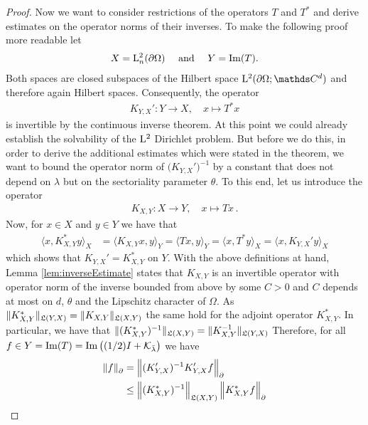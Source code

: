 \begin{proof}
  Now we want to consider restrictions of the operators $T$ and $T^*$ and derive estimates on the operator norms of their inverses.
  To make the following proof more readable let 
  \begin{align*}
    X = \mathrm{L}^2_n(\partial\Omega)\quad\text{ and }\quad Y = \operatorname{Im}(T).
  \end{align*}
  Both spaces are closed subspaces of the Hilbert space $\Ell^2(\partial\Omega; \C^d)$ and therefore again Hilbert spaces.
  Consequently, the operator
  \begin{align*}
    K_{Y,X}' \colon Y \to X, \quad x \mapsto T^* x
  \end{align*}
  is invertible by the continuous inverse theorem.
  At this point we could already establish the solvability of the $\mathrm{L}^2$ Dirichlet problem.
  But before we do this, in order to derive the additional estimates which were stated in the theorem, we want to bound the operator norm of $\big(K_{Y,X}'\big)^{-1}$ by a constant that does not depend on $\lambda$ but on the sectoriality parameter $\theta$.
  To this end, let us introduce the operator
  \begin{align*}
    K_{X,Y} \colon X \to Y, \quad x \mapsto T x \,.
  \end{align*}
  Now, for $x \in X$ and $y \in Y$ we have that
  \begin{align*}
    \Big\langle x, K_{X,Y}^* y \Big\rangle_X
    & =\Big\langle K_{X,Y}^{} x, y  \Big\rangle_Y
      =\Big\langle T x, y        \Big\rangle_Y
      =\Big\langle x, T^*y       \Big\rangle_X
      =\Big\langle x, K_{Y,X}' y \Big\rangle_X
  \end{align*}
  which shows that $K_{Y,X}' = K_{X,Y}^*$ on $Y$.
  With the above definitions at hand, Lemma \ref{lem:inverseEstimate} states that $K_{X,Y}^{}$ is an invertible operator with operator norm of the inverse bounded from above by some $C > 0$ and $C$ depends at most on $d$, $\theta$ and the Lipschitz character of $\Omega$.
  As $\| K_{X,Y}^* \|_{\mathfrak{L}(Y,X)} = \|K_{X,Y}\|_{\mathfrak{L}(X, Y)}$ the same hold for the adjoint operator $K_{X,Y}^*$.
  In particular, we have that $\|(K_{X,Y}^*)^{-1} \|_{\mathfrak{L}(X,Y)} = \|K_{X,Y}^{-1}\|_{\mathfrak{L}(Y,X)}$
  Therefore, for all $f \in Y = \operatorname{Im}(T) = \operatorname{Im} \big((1/2)I + \mathcal{K}_{\bar \lambda}\big)$ we have
  \begin{align}
    \label{eq:dualityArgument}
    \begin{alignedat}{1}
    \| f\|_\partial^{}
    &= \Big\| (K_{Y,X}')^{-1} K_{Y,X}' f \Big\|_\partial^{} \\
      &\leq  \Big\| (K_{X,Y}^*)^{-1} \Big\|_{\Li(X,Y)}^{}\, \Big\| K_{X,Y}^* f\Big\|_\partial^{} %

\end{alignedat}
\end{align}
\end{proof}
